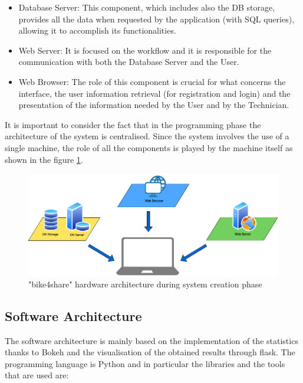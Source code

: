 \documentclass{article}
\begin{document}
\begin{itemize}
    \item Database Server: This component, which includes also the DB storage, provides all the data when requested by the application (with SQL queries), allowing it to accomplish its functionalities.
    \item Web Server: It is focused on the workflow and it is responsible for the communication with both the Database Server and the User.
    \item Web Browser: The role of this component is crucial for what concerns the interface, the user information retrieval (for registration and login) and the presentation of the information needed by the User and by the Technician. 
\end{itemize}
It is important to consider the fact that in the programming phase the architecture of the system is centralised. Since the system involves the use of a single machine, the role of all the components is played by the machine itself as shown in the figure \ref{fig:com_createSchema}.\\
\begin{figure}[H]
    \centering
    \includegraphics[width=0.85\linewidth]{image/hardware_architecture.png}
    \caption{"bike4share" hardware architecture during system creation phase}
    \label{fig:com_createSchema}
\end{figure}

\subsection{Software Architecture}
The software architecture is mainly based on the implementation of the statistics thanks to Bokeh and the visualisation of the obtained results through flask.
The programming language is Python and in particular the libraries and the tools that are used are:
\end{document}
